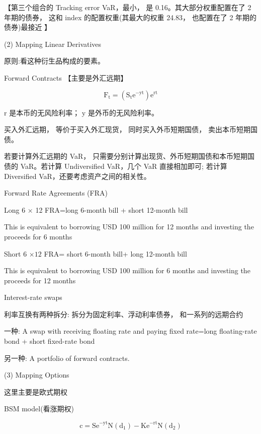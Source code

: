     【第三个组合的 Tracking error VaR，最小， 是 0.16。其大部分权重配置在了 2 年期的债券， 这和 index 的配置权重(其最大的权重 24.83， 也配置在了 2 年期的债券)最接近 】
    
    (2) Mapping Linear Derivatives
    
     原则:看这种衍生品构成的要素。
    
     Forward Contracts 【主要是外汇远期】
    
    \[
    {\mathrm{F}}_{\mathrm{t}} = \left( {{\mathrm{S}}_{\mathrm{t}}{\mathrm{e}}^{-\mathrm{{yt}}}}\right) {\mathrm{e}}^{\mathrm{{rt}}}
    \]
    
    \(\mathrm{r}\) 是本币的无风险利率； \(\mathrm{y}\) 是外币的无风险利率。
    
    买入外汇远期， 等价于买入外汇现货， 同时买入外币短期国债， 卖出本币短期国债。
    
    若要计算外汇远期的 VaR， 只需要分别计算出现货、外币短期国债和本币短期国债的 VaR。若计算 Undiversified VaR，几个 VaR 直接相加即可; 若计算 Diversified VaR，还要考虑资产之间的相关性。
    
    Forward Rate Agreements (FRA)
    
    Long 6 × 12 FRA=long 6-month bill + short 12-month bill
    
    This is equivalent to borrowing USD 100 million for 12 months and investing the proceeds for 6 months
    
    Short 6 \(\times  {12}\) FRA= short 6-month bill+ long 12-month bill
    
    This is equivalent to borrowing USD 100 million for 6 months and investing the proceeds for 12 months
    
    Interest-rate swaps
    
    利率互换有两种拆分: 拆分为固定利率、浮动利率债券， 和一系列的远期合约
    
    一种: A swap with receiving floating rate and paying fixed rate=long floating-rate bond + short fixed-rate bond
    
    另一种: A portfolio of forward contracts.
    
    (3) Mapping Options
    
     这里主要是欧式期权
    
    BSM model(看涨期权)
    
    \[
    \mathrm{c} = {\mathrm{{Se}}}^{-\mathrm{{yt}}}\mathrm{N}\left( {\mathrm{d}}_{1}\right)  - {\mathrm{{Ke}}}^{-\mathrm{{rt}}}\mathrm{N}\left( {\mathrm{d}}_{2}\right)
    \]
    
